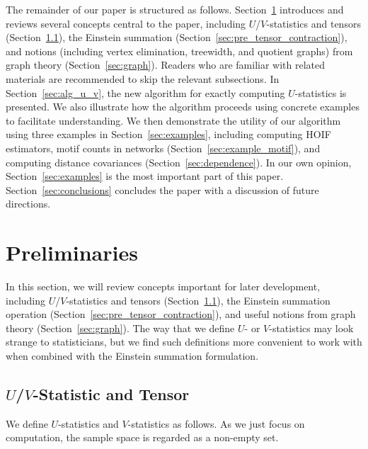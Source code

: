 \documentclass[twoside,11pt]{article}
\newcommand{\pdfu}{\texorpdfstring{$U$}{U}}
\newcommand{\pdfv}{\texorpdfstring{$V$}{V}}
\newcommand{\degp}[2]{\deg_{#2}(#1)}
\begin{document}

The remainder of our paper is structured as follows. Section~\ref{sec:preliminaries} introduces and reviews several concepts central to the paper, including $U$/$V$-statistics and tensors (Section~\ref{sec:pre_u_v}), the Einstein summation (Section~\ref{sec:pre_tensor_contraction}), and notions (including vertex elimination, treewidth, and quotient graphs) from graph theory (Section~\ref{sec:graph}). Readers who are familiar with related materials are recommended to skip the relevant subsections. In Section~\ref{sec:alg_u_v}, the new algorithm for exactly computing $U$-statistics is presented. We also illustrate how the algorithm proceeds using concrete examples to facilitate understanding. We then demonstrate the utility of our algorithm using three examples in Section~\ref{sec:examples}, including computing HOIF estimators, motif counts in networks (Section~\ref{sec:example_motif}), and computing distance covariances (Section~\ref{sec:dependence}). In our own opinion, Section~\ref{sec:examples} is the most important part of this paper. Section~\ref{sec:conclusions} concludes the paper with a discussion of future directions.

\section{Preliminaries}
\label{sec:preliminaries}

In this section, we will review concepts important for later development, including $U$/$V$-statistics and tensors (Section~\ref{sec:pre_u_v}), the Einstein summation operation (Section~\ref{sec:pre_tensor_contraction}), and useful notions from graph theory (Section~\ref{sec:graph}). The way that we define $U$- or $V$-statistics may look strange to statisticians, but we find such definitions more convenient to work with when combined with the Einstein summation formulation.

\subsection{\pdfu/\pdfv-Statistic and Tensor}\label{sec:pre_u_v}

We define $U$-statistics and $V$-statistics as follows. As we just focus on computation, the sample space is regarded as a non-empty set. 
\end{document}
